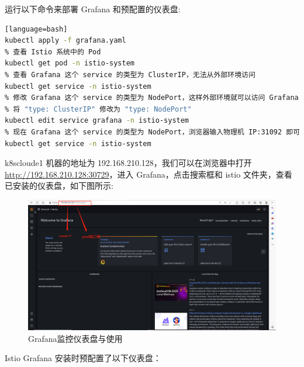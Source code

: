 运行以下命令来部署 Grafana 和预配置的仪表盘:
\begin{lstlisting}[language=bash][language=bash]
kubectl apply -f grafana.yaml
% 查看 Istio 系统中的 Pod
kubectl get pod -n istio-system
% 查看 Grafana 这个 service 的类型为 ClusterIP，无法从外部环境访问
kubectl get service -n istio-system
% 修改 Grafana 这个 service 的类型为 NodePort，这样外部环境就可以访问 Grafana
% 将 "type: ClusterIP" 修改为 "type: NodePort"
kubectl edit service grafana -n istio-system
% 现在 Grafana 这个 service 的类型为 NodePort，浏览器输入物理机 IP:31092 即可访问 Grafana 网页
kubectl get service -n istio-system
\end{lstlisting}

k8scloude1 机器的地址为 192.168.210.128，我们可以在浏览器中打开 \url{http://192.168.210.128:30729}，进入 Grafana，点击搜索框和 istio 文件夹，查看已安装的仪表盘，如下图所示:
\begin{figure}[H]
	\centering
	\includegraphics[width=1.0\textwidth]{figures/chapter2/grafana.png}
	\caption{Grafana监控仪表盘与使用}
	\label{fig:3-Grafana监控仪表盘与使用}
\end{figure}
Istio Grafana 安装时预配置了以下仪表盘：


